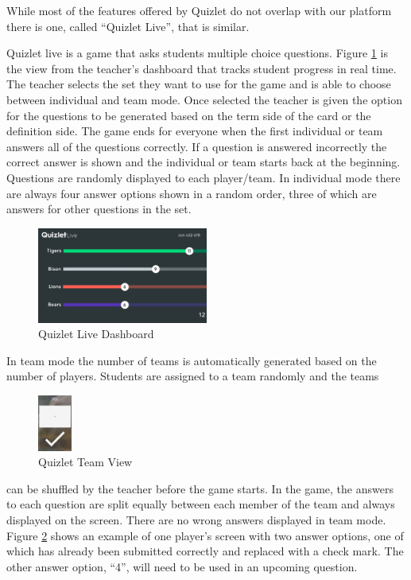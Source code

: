 \documentclass{article}
\begin{document}
        While most of the features offered by Quizlet do not overlap with our platform there is one, called ``Quizlet Live'', that is similar.
        \smallskip
        
        Quizlet live is a game that asks students multiple choice questions. Figure \ref{fig:quizlet-live} is the view from the teacher's dashboard that tracks student progress in real time. The teacher selects the set they want to use for the game and is able to choose between individual and team mode. Once selected the teacher is given the option for the questions to be generated based on the term side of the card or the definition side. The game ends for everyone when the first individual or team answers all of the questions correctly. If a question is answered incorrectly the correct answer is shown and the individual or team starts back at the beginning. Questions are randomly displayed to each player/team. In individual mode there are always four answer options shown in a random order, three of which are answers for other questions in the set.
        
        \begin{figure}[ht]
            \centering
            \includegraphics[width=0.5\textwidth]{images/quizlet-live.png}
            \caption{Quizlet Live Dashboard \cite{quizlet}}
            \label{fig:quizlet-live}
        \end{figure}
        
        In team mode the number of teams is automatically generated based on the number of players. Students are assigned to a team randomly and the teams
        \begin{figure}
            \centering
            \includegraphics[width=0.10\textwidth]{images/quizlet-team.png}
            \caption{Quizlet Team View \cite{quizlet}}
            \label{fig:quizlet-team}
        \end{figure}
        can be shuffled by the teacher before the game starts. In the game, the answers to each question are split equally between each member of the team and always displayed on the screen. There are no wrong answers displayed in team mode.
        Figure \ref{fig:quizlet-team} shows an example of one player's screen with two answer options, one of which has already been submitted correctly and replaced with a check mark. The other answer option, ``4'', will need to be used in an upcoming question.
        \smallskip
        
\end{document}
